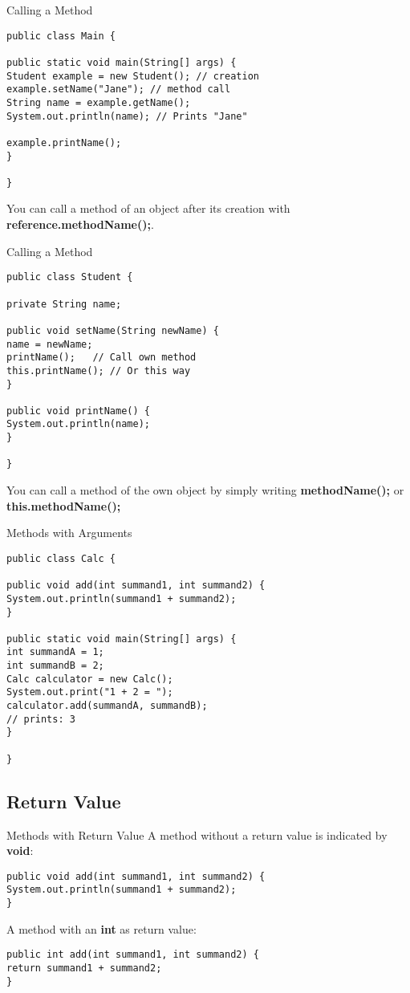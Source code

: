 \begin{frame}[fragile]{Calling a Method}
\begin{lstlisting}
public class Main {

public static void main(String[] args) {
Student example = new Student(); // creation
example.setName("Jane"); // method call
String name = example.getName(); 
System.out.println(name); // Prints "Jane"

example.printName();
}

}
\end{lstlisting}
You can call a method of an object after its creation with \textbf{reference.methodName();}.
\end{frame}

\begin{frame}[fragile]{Calling a Method}
\begin{lstlisting}
public class Student {

private String name;

public void setName(String newName) {
name = newName;
printName();   // Call own method
this.printName(); // Or this way
}

public void printName() {
System.out.println(name);
}

}
\end{lstlisting}
You can call a method of the own object by simply writing \textbf{methodName();} or \textbf{this.methodName();}
\end{frame}

\begin{frame}[fragile]{Methods with Arguments}

\begin{lstlisting}
public class Calc {

public void add(int summand1, int summand2) {
System.out.println(summand1 + summand2);
}

public static void main(String[] args) {
int summandA = 1;
int summandB = 2;
Calc calculator = new Calc();
System.out.print("1 + 2 = ");
calculator.add(summandA, summandB); 
// prints: 3
}

}
\end{lstlisting}
\end{frame}

\subsection{Return Value}
\begin{frame}[fragile]{Methods with Return Value}
A method without a return value is indicated by \textbf{void}:
\begin{lstlisting}
public void add(int summand1, int summand2) {
System.out.println(summand1 + summand2);
}
\end{lstlisting}
A method with an \textbf{int} as return value:
\begin{lstlisting}
public int add(int summand1, int summand2) {
return summand1 + summand2;
}
\end{lstlisting}
\end{frame}

